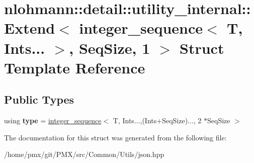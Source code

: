 \hypertarget{structnlohmann_1_1detail_1_1utility__internal_1_1Extend_3_01integer__sequence_3_01T_00_01Ints_8_011635d85b816e1c1a7e948fa832c519}{}\section{nlohmann\+:\+:detail\+:\+:utility\+\_\+internal\+:\+:Extend$<$ integer\+\_\+sequence$<$ T, Ints... $>$, Seq\+Size, 1 $>$ Struct Template Reference}
\label{structnlohmann_1_1detail_1_1utility__internal_1_1Extend_3_01integer__sequence_3_01T_00_01Ints_8_011635d85b816e1c1a7e948fa832c519}
\subsection*{Public Types}
\begin{DoxyCompactItemize}
\item 
\mbox{\label{structnlohmann_1_1detail_1_1utility__internal_1_1Extend_3_01integer__sequence_3_01T_00_01Ints_8_011635d85b816e1c1a7e948fa832c519_a92558ed5df85e65e1a68ec1de14e2a7c}} 
using {\bfseries type} = \hyperlink{structnlohmann_1_1detail_1_1integer__sequence}{integer\+\_\+sequence}$<$ T, Ints...,(Ints+Seq\+Size)..., 2 $\ast$Seq\+Size $>$
\end{DoxyCompactItemize}


The documentation for this struct was generated from the following file\+:\begin{DoxyCompactItemize}
\item 
/home/pmx/git/\+P\+M\+X/src/\+Common/\+Utils/json.\+hpp\end{DoxyCompactItemize}
